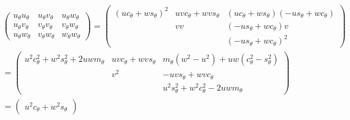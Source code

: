 \documentclass[a4paper,12pt]{article}
\begin{document}
\begin{eqnarray} 
  \left(\begin{array}{ccc} 
    u_\theta u_\theta & u_\theta v_\theta & u_\theta w_\theta \\ 
    u_\theta v_\theta & v_\theta v_\theta & v_\theta w_\theta \\ 
    u_\theta w_\theta & v_\theta w_\theta & w_\theta w_\theta 
  \end{array} \right) =
  \left(\begin{array}{ccc} 
    (u c_\theta + w s_\theta )^2&
    uvc_\theta +wvs_\theta&
    (uc_\theta +ws_\theta)(-us_\theta +wc_\theta)\\
    & vv & (-us_\theta+wc_\theta)v\\ 
    && (-us_\theta +w c_\theta)^2 \end{array}\right)\\
  = \left(\begin{array}{ccc}  
    u^2c_\theta^2 +w^2 s_\theta^2 + 2uw m_\theta&
    uvc_\theta +wvs_\theta&
    m_\theta (w^2-u^2)+uw(c_\theta^2 -s_\theta^2) \\
    &v^2& -uvs_\theta + wvc_\theta\\
    && u^2s_\theta^2 + w^2 c_\theta^2 - 2uw m_\theta
    \end{array}\right) \\ 
  = \left(\begin{array}{ccc} 
    u^2c_\theta +w^2s_\theta
  \end{array}\right)
\end{eqnarray} 
\end{document}
